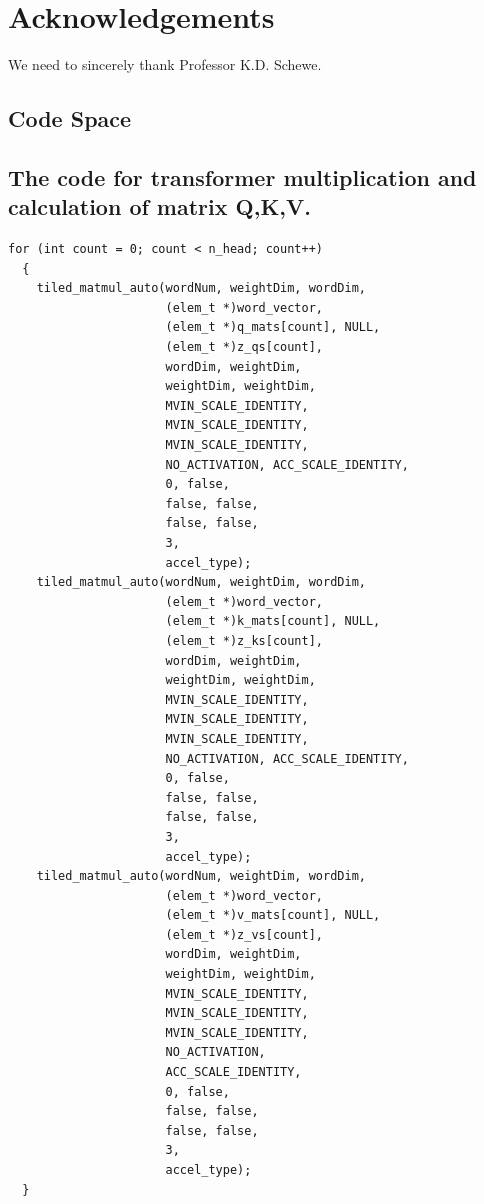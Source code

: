 \documentclass[default,iicol]{sn-jnl}%
\theoremstyle{thmstyleone}%
\theoremstyle{thmstyletwo}%
\theoremstyle{thmstylethree}%
\begin{document}
\section{Acknowledgements}\label{sec7}
We need to sincerely thank Professor K.D. Schewe.




\newpage 
\onecolumn
\begin{appendices}

\section{Code Space}\label{secA}
\subsection{The code for transformer multiplication and calculation of matrix Q,K,V.}\label{secA1}

\lstset{language=C}
\begin{lstlisting}
for (int count = 0; count < n_head; count++)
  {
    tiled_matmul_auto(wordNum, weightDim, wordDim,
                      (elem_t *)word_vector, 
                      (elem_t *)q_mats[count], NULL, 
                      (elem_t *)z_qs[count],
                      wordDim, weightDim, 
                      weightDim, weightDim,
                      MVIN_SCALE_IDENTITY, 
                      MVIN_SCALE_IDENTITY, 
                      MVIN_SCALE_IDENTITY,
                      NO_ACTIVATION, ACC_SCALE_IDENTITY, 
                      0, false,
                      false, false,
                      false, false,
                      3,
                      accel_type);
    tiled_matmul_auto(wordNum, weightDim, wordDim,
                      (elem_t *)word_vector, 
                      (elem_t *)k_mats[count], NULL, 
                      (elem_t *)z_ks[count],
                      wordDim, weightDim, 
                      weightDim, weightDim,
                      MVIN_SCALE_IDENTITY, 
                      MVIN_SCALE_IDENTITY, 
                      MVIN_SCALE_IDENTITY,
                      NO_ACTIVATION, ACC_SCALE_IDENTITY, 
                      0, false,
                      false, false,
                      false, false,
                      3,
                      accel_type);
    tiled_matmul_auto(wordNum, weightDim, wordDim,
                      (elem_t *)word_vector, 
                      (elem_t *)v_mats[count], NULL, 
                      (elem_t *)z_vs[count],
                      wordDim, weightDim, 
                      weightDim, weightDim,
                      MVIN_SCALE_IDENTITY, 
                      MVIN_SCALE_IDENTITY, 
                      MVIN_SCALE_IDENTITY,
                      NO_ACTIVATION, 
                      ACC_SCALE_IDENTITY, 
                      0, false,
                      false, false,
                      false, false,
                      3,
                      accel_type);
  }



\end{lstlisting}
\end{appendices}
\end{document}
